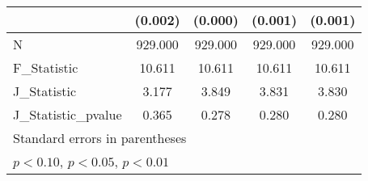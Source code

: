{\begin{tabular}{l*{4}{c}}
            &     (0.002)         &     (0.000)         &     (0.001)         &     (0.001)         \\
\hline
N           &     929.000         &     929.000         &     929.000         &     929.000         \\
F\_Statistic &      10.611         &      10.611         &      10.611         &      10.611         \\
J\_Statistic &       3.177         &       3.849         &       3.831         &       3.830         \\
J\_Statistic\_pvalue&       0.365         &       0.278         &       0.280         &       0.280         \\
\hline\hline
\multicolumn{5}{l}{\footnotesize Standard errors in parentheses}\\
\multicolumn{5}{l}{\footnotesize \sym{*} \(p<0.10\), \sym{**} \(p<0.05\), \sym{***} \(p<0.01\)}\\
\end{tabular}
}
